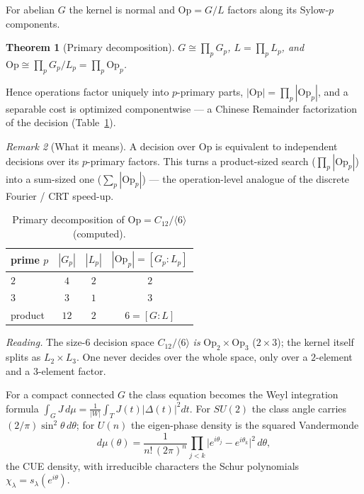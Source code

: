 \documentclass[11pt,a4paper]{article}
\newcommand{\Op}{\mathrm{Op}}
\theoremstyle{plain}
\newtheorem{theorem}{Theorem}
\theoremstyle{definition}
\theoremstyle{remark}
\newtheorem{remark}[theorem]{Remark}
\begin{document}
For abelian $G$ the kernel is normal and $\Op=G/L$ factors along its
Sylow-$p$ components.

\begin{theorem}[Primary decomposition]\label{thm:primary}
$G\cong\prod_p G_p$, $L=\prod_p L_p$, and
$\Op\cong\prod_p G_p/L_p=\prod_p\Op_p$.
\end{theorem}

Hence operations factor uniquely into $p$-primary parts, $|\Op|=\prod_p|\Op_p|$,
and a separable cost is optimized componentwise --- a Chinese Remainder
factorization of the decision (Table~\ref{tab:primary}).

\begin{remark}[What it means]
A decision over $\Op$ is equivalent to independent decisions over its
$p$-primary factors. This turns a product-sized search ($\prod_p|\Op_p|$) into a
sum-sized one ($\sum_p|\Op_p|$) --- the operation-level analogue of the discrete
Fourier / CRT speed-up.
\end{remark}

\begin{table}[ht]
\centering
\caption{Primary decomposition of $\Op=C_{12}/\langle 6\rangle$ (computed).}
\label{tab:primary}
\begin{tabular}{lccc}
\toprule
prime $p$ & $|G_p|$ & $|L_p|$ & $|\Op_p|=[G_p:L_p]$ \\
\midrule
$2$ & $4$ & $2$ & $2$ \\
$3$ & $3$ & $1$ & $3$ \\
\midrule
product & $12$ & $2$ & $6=[G:L]$ \\
\bottomrule
\end{tabular}
\end{table}

\noindent\emph{Reading.} The size-$6$ decision space $C_{12}/\langle6\rangle$
\emph{is} $\Op_2\times\Op_3$ ($2\times3$); the kernel itself splits as
$L_2\times L_3$. One never decides over the whole space, only over a
$2$-element and a $3$-element factor.

For a compact connected $G$ the class equation becomes the Weyl integration
formula $\int_G J\,d\mu=\frac{1}{|W|}\int_T J(t)|\Delta(t)|^2dt$. For $SU(2)$ the
class angle carries $(2/\pi)\sin^2\theta\,d\theta$; for $U(n)$ the eigen-phase
density is the squared Vandermonde
\begin{equation}\label{eq:weyl}
d\mu(\theta)=\frac{1}{n!\,(2\pi)^n}\prod_{j<k}\bigl|e^{i\theta_j}-e^{i\theta_k}
\bigr|^2\,d\theta,
\end{equation}
the CUE density, with irreducible characters the Schur polynomials
$\chi_\lambda=s_\lambda(e^{i\theta})$.
\end{document}
